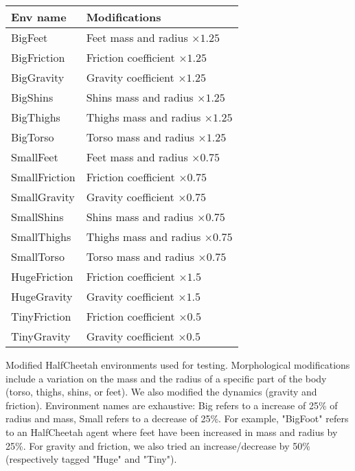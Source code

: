 \begin{tabular}{l|l}
\textbf{Env name}&\textbf{Modifications} \\\midrule
BigFeet & Feet mass and radius $\times 1.25$ \\
BigFriction & Friction coefficient $\times 1.25$ \\
BigGravity& Gravity coefficient $\times 1.25$ \\
BigShins& Shins mass and radius $\times 1.25$ \\
BigThighs& Thighs mass and radius $\times 1.25$ \\
BigTorso& Torso mass and radius $\times 1.25$ \\
SmallFeet &Feet mass and radius $\times 0.75$ \\
SmallFriction &Friction coefficient $\times 0.75$ \\
SmallGravity&Gravity coefficient $\times 0.75$ \\
SmallShins &Shins mass and radius $\times 0.75$ \\
SmallThighs &Thighs mass and radius $\times 0.75$ \\
SmallTorso& Torso mass and radius $\times 0.75$ \\
HugeFriction & Friction coefficient $\times 1.5$ \\
HugeGravity &Gravity coefficient $\times 1.5$ \\
TinyFriction& Friction coefficient $\times 0.5$ \\
TinyGravity &Gravity coefficient $\times 0.5$ \\
\hline
\end{tabular}
\caption{Modified HalfCheetah environments used for testing. Morphological modifications include a variation on the mass and the radius of a specific part of the body (torso, thighs, shins, or feet). We also modified the dynamics (gravity and friction). Environment names are exhaustive: Big refers to a increase of 25\% of radius and mass, Small refers to a decrease of 25\%. For example, "BigFoot" refers to an HalfCheetah agent where feet have been increased in mass and radius by 25\%. For gravity and friction, we also tried an increase/decrease by 50\% (respectively tagged "Huge" and "Tiny").}